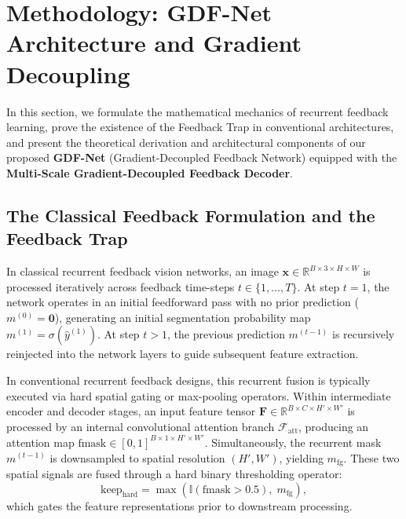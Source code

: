 \section{Methodology: GDF-Net Architecture and Gradient Decoupling}
\label{sec:method}

In this section, we formulate the mathematical mechanics of recurrent feedback learning, prove the existence of the Feedback Trap in conventional architectures, and present the theoretical derivation and architectural components of our proposed \textbf{GDF-Net} (Gradient-Decoupled Feedback Network) equipped with the \textbf{Multi-Scale Gradient-Decoupled Feedback Decoder}.

\subsection{The Classical Feedback Formulation and the Feedback Trap}
In classical recurrent feedback vision networks, an image $\mathbf{x} \in \mathbb{R}^{B \times 3 \times H \times W}$ is processed iteratively across feedback time-steps $t \in \{1, \dots, T\}$. At step $t=1$, the network operates in an initial feedforward pass with no prior prediction ($m^{(0)} = \mathbf{0}$), generating an initial segmentation probability map $m^{(1)} = \sigma(\hat{y}^{(1)})$. At step $t > 1$, the previous prediction $m^{(t-1)}$ is recursively reinjected into the network layers to guide subsequent feature extraction.

In conventional recurrent feedback designs, this recurrent fusion is typically executed via hard spatial gating or max-pooling operators. Within intermediate encoder and decoder stages, an input feature tensor $\mathbf{F} \in \mathbb{R}^{B \times C \times H' \times W'}$ is processed by an internal convolutional attention branch $\mathcal{F}_{\text{att}}$, producing an attention map $\text{fmask} \in [0, 1]^{B \times 1 \times H' \times W'}$. Simultaneously, the recurrent mask $m^{(t-1)}$ is downsampled to spatial resolution $(H', W')$, yielding $m_{\text{fg}}$. These two spatial signals are fused through a hard binary thresholding operator:
\begin{equation}
  \label{eq:keep_hard}
  \text{keep}_{\text{hard}} = \max\!\left(\mathbb{I}(\text{fmask} > 0.5),\; m_{\text{fg}}\right),
\end{equation}
which gates the feature representations prior to downstream processing.


